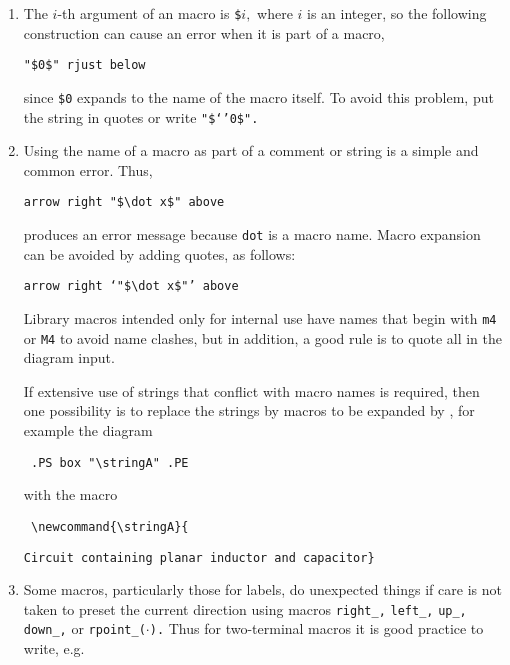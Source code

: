 \begin{enumerate}
  To keep track of paired single quotes, parentheses ``{\tt (}, {\tt)},''
  braces ``\lbr, \rbr,'' and brackets ``{\tt [}, {\tt ]},'' use an editor
  that highlights these pairs.  For example, the vim editor highlights
  single quotes with the command \verb|:set mps+=`:'|.

\item 
{}
The $i$-th argument of an \Mfour macro is {\tt \$}$i,$ where $i$ is
an integer, so the following construction can cause an error when it
is part of a macro,

{\tt "\$0\$" rjust below}

\noindent since {\tt \$0} expands to the name of the macro itself.
To avoid this problem, put the string in quotes or write
 {\tt "\$`'0\$".}

\item 
{}
 Using the name of a macro as part of a comment or string is a
 simple and common error. Thus,

{\tt arrow right \verb|"$\dot x$"| above}

\noindent produces an error message because {\tt dot} is a macro
name.   Macro expansion can be avoided by adding quotes, as follows:

{\tt arrow right `\verb|"$\dot x$"|'\ above}

Library macros intended only for internal use have names that begin
with {\tt m4} or {\tt M4} to avoid name clashes, but in addition,
a good rule is to quote all \latex in the diagram input.

If extensive use of strings
that conflict with macro names is required, then one possibility is
to replace the strings by macros to be expanded by \latex, for example
the diagram

{\tt
.PS\hfill\break
   \hspace*{\parindent} box \verb|"\stringA"|\hfill\break
.PE
}

\noindent with the \latex macro

{\tt
  \verb|\newcommand{\stringA}{|%

   \verb|Circuit containing planar inductor and capacitor}|
}

\item 
{}
 Some macros, particularly those for labels, do
unexpected things if care is not taken to preset the current direction
using macros {\tt right\_,} {\tt left\_,} {\tt up\_,} {\tt down\_,}
or {\tt rpoint\_($\cdot$).}
Thus for two-terminal macros it is good practice to write, e.g.


\end{enumerate}
